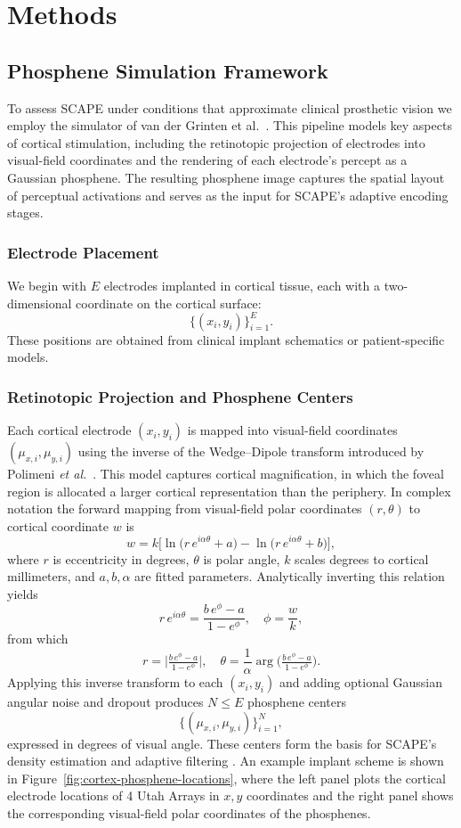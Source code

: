 \section{Methods}

\subsection{Phosphene Simulation Framework}
To assess SCAPE under conditions that approximate clinical prosthetic vision we employ the simulator of van der Grinten et al.\ \cite{vanderGrinten2024}. This pipeline models key aspects of cortical stimulation, including the retinotopic projection of electrodes into visual-field coordinates and the rendering of each electrode’s percept as a Gaussian phosphene. The resulting phosphene image captures the spatial layout of perceptual activations and serves as the input for SCAPE’s adaptive encoding stages.


\subsubsection{Electrode Placement}
We begin with \(E\) electrodes implanted in cortical tissue, each with a two-dimensional coordinate on the cortical surface:
\[
\{(x_i,y_i)\}_{i=1}^E.
\]
These positions are obtained from clinical implant schematics or patient-specific models.


\subsubsection{Retinotopic Projection and Phosphene Centers}
Each cortical electrode \((x_i,y_i)\) is mapped into visual-field coordinates \((\mu_{x,i},\mu_{y,i})\) using the inverse of the Wedge–Dipole transform introduced by Polimeni \emph{et al.}\ \cite{Polimeni2006}. This model captures cortical magnification, in which the foveal region is allocated a larger cortical representation than the periphery. In complex notation the forward mapping from visual-field polar coordinates \((r,\theta)\) to cortical coordinate \(w\) is
\[
w = k\bigl[\ln\bigl(r\,e^{i\alpha\theta} + a\bigr) 
       - \ln\bigl(r\,e^{i\alpha\theta} + b\bigr)\bigr],
\]
where \(r\) is eccentricity in degrees, \(\theta\) is polar angle, \(k\) scales degrees to cortical millimeters, and \(a,b,\alpha\) are fitted parameters. Analytically inverting this relation yields
\[
r\,e^{i\alpha\theta}
  = \frac{b\,e^{\phi} - a}{1 - e^{\phi}},
\quad
\phi = \frac{w}{k},
\]
from which
\[
r = \bigl|\tfrac{b\,e^{\phi} - a}{1 - e^{\phi}}\bigr|,
\quad
\theta = \frac{1}{\alpha}\arg\!\bigl(\tfrac{b\,e^{\phi} - a}{1 - e^{\phi}}\bigr).
\]
Applying this inverse transform to each \((x_i,y_i)\) and adding optional Gaussian angular noise and dropout produces \(N\le E\) phosphene centers
\[
\{(\mu_{x,i},\mu_{y,i})\}_{i=1}^N,
\]
expressed in degrees of visual angle. These centers form the basis for SCAPE’s density estimation and adaptive filtering \cite{vanderGrinten2024}. An example implant scheme is shown in Figure~\ref{fig:cortex-phosphene-locations}, where the left panel plots the cortical electrode locations of 4 Utah Arrays in \(x,y\) coordinates and the right panel shows the corresponding visual‐field polar coordinates of the phosphenes.

